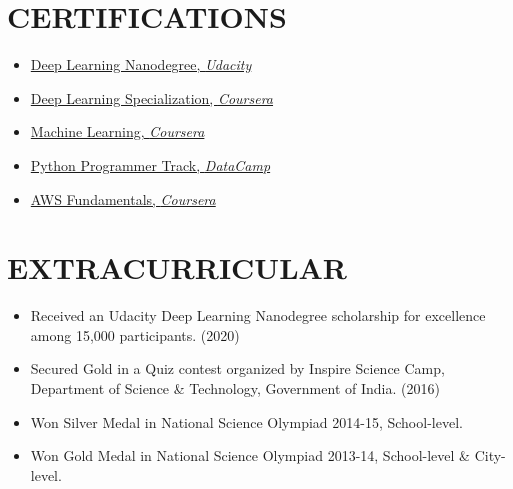 \documentclass[letterpaper,11pt]{article}
\newcommand{\resumeItem}[1]{
  \item\small{
    {#1 \vspace{-2pt}}
  }
}
\newcommand{\resumeItemListStart}{\begin{itemize}}
\newcommand{\resumeItemListEnd}{\end{itemize}\vspace{-5pt}}
\begin{document}
\section{CERTIFICATIONS}
\begin{multicols}{2}
	\begin{itemize}[itemsep=-1pt, parsep=5pt]
		\item {\href{https://graduation.udacity.com/confirm/ZFNDVDQU}{Deep Learning Nanodegree, \textit{Udacity}} {\raisebox{-0.1\height}\faExternalLink}}
		\item {\href{https://www.coursera.org/account/accomplishments/specialization/EJWXYS5SBM2E}{Deep Learning Specialization, \textit{Coursera}} {\raisebox{-0.1\height}\faExternalLink}}
		\item {\href{https://www.coursera.org/account/accomplishments/verify/DB2AH7JVG9KU}{Machine Learning, \textit{Coursera}} {\raisebox{-0.1\height}\faExternalLink}}
		\item {\href{https://www.datacamp.com/statement-of-accomplishment/track/ca45219c995c9ea42262772e58872ae77889c14e}{Python Programmer Track, \textit{DataCamp}} {\raisebox{-0.1\height}\faExternalLink}}
		\item {\href{https://www.coursera.org/account/accomplishments/specialization/LLHNWWQWQHQM}{AWS Fundamentals, \textit{Coursera}} {\raisebox{-0.1\height}\faExternalLink}}
	\end{itemize}
\end{multicols}
\vspace*{0.5\multicolsep}


\section{EXTRACURRICULAR}
\resumeItemListStart[itemsep=2pt]
\resumeItem{\normalsize{Received an Udacity Deep Learning Nanodegree scholarship for excellence among 15,000 participants. (2020)}}
\resumeItem{\normalsize{Secured Gold in a Quiz contest organized by Inspire Science Camp, Department of Science \& Technology, Government of India. (2016)}}
\resumeItem{\normalsize{Won Silver Medal in National Science Olympiad 2014-15, School-level.}}
\resumeItem{\normalsize{Won Gold Medal in National Science Olympiad 2013-14, School-level \& City-level.}}
\resumeItemListEnd
\end{document}

